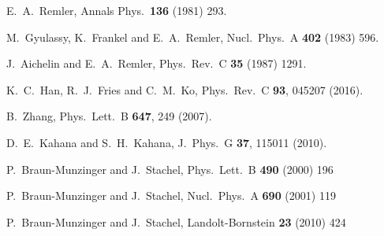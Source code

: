 \documentclass[twocolumn,aps,superscriptaddress,showpacs,nofootinbib,floatfix]{revtex4}
\begin{document}
\begin{thebibliography}{99}
  E.~A.~Remler,
  Annals Phys.\  {\bf 136} (1981) 293.

  M.~Gyulassy, K.~Frankel and E.~A.~Remler,
  Nucl.\ Phys.\ A {\bf 402} (1983) 596.

  J.~Aichelin and E.~A.~Remler,
  Phys.\ Rev.\ C {\bf 35} (1987) 1291.

  K.~C.~Han, R.~J.~Fries and C.~M.~Ko,
  Phys.\ Rev.\ C {\bf 93}, 045207 (2016).


  B.~Zhang,
  Phys.\ Lett.\ B {\bf 647}, 249 (2007).

  D.~E.~Kahana and S.~H.~Kahana,
  J.\ Phys.\ G {\bf 37}, 115011 (2010).

  P.~Braun-Munzinger and J.~Stachel,
  Phys.\ Lett.\ B {\bf 490} (2000) 196

  P.~Braun-Munzinger and J.~Stachel,
  Nucl.\ Phys.\ A {\bf 690} (2001) 119 

  P.~Braun-Munzinger and J.~Stachel,
  Landolt-Bornstein {\bf 23} (2010) 424


\end{thebibliography}
\end{document}
